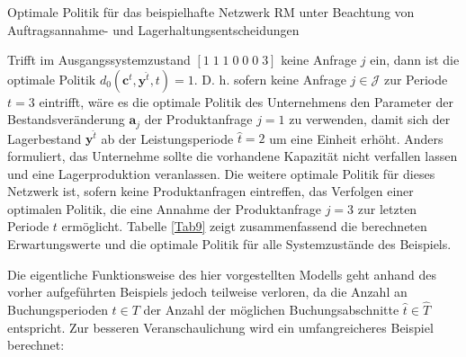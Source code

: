 \begin{table}
\begin{footnotesize}
     \caption{Optimale Politik für das beispielhafte Netzwerk RM unter Beachtung von Auftragsannahme- und Lagerhaltungsentscheidungen} \label{Tab9}
    \vspace*{3mm}
        \begin{center}
      \end{center}
    \begin{center}
      \end{center}
\end{footnotesize}
\end{table}

Trifft im Ausgangssystemzustand $[1\;1\;1\;0\;0\;0\;3]$ keine Anfrage $j$ ein, dann ist die optimale Politik $d_{0}({\textbf{c}^{\hat t},\textbf{y}^{\hat t}, t})=1$. D. h. sofern keine Anfrage $j\in\mathcal{J}$ zur Periode $t=3$ eintrifft, wäre es die optimale Politik des Unternehmens den Parameter der Bestandsveränderung $\textbf{a}_j$ der Produktanfrage $j=1$ zu verwenden, damit sich der Lagerbestand $\textbf{y}^{\hat t}$ ab der Leistungsperiode $\hat{t}=2$ um eine Einheit erhöht. Anders formuliert, das Unternehme sollte die vorhandene Kapazität nicht verfallen lassen und eine Lagerproduktion veranlassen. Die weitere optimale Politik für dieses Netzwerk ist, sofern keine Produktanfragen eintreffen, das Verfolgen einer optimalen Politik, die eine Annahme der Produktanfrage $j=3$ zur letzten Periode $t$ ermöglicht. Tabelle \ref{Tab9} zeigt zusammenfassend die berechneten Erwartungswerte und die optimale Politik für alle Systemzustände des Beispiels.

Die eigentliche Funktionsweise des hier vorgestellten Modells geht anhand des vorher aufgeführten Beispiels jedoch teilweise verloren, da die Anzahl an Buchungsperioden $t\in T$ der Anzahl der möglichen Buchungsabschnitte $\hat{t}\in\hat{T}$ entspricht. Zur besseren Veranschaulichung wird ein umfangreicheres Beispiel berechnet:

